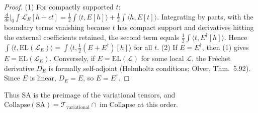 \documentclass{article}
\theoremstyle{remark}
\newcommand{\Coll}{\mathrm{Collapse}}
\begin{document}
\begin{proof}
(1) For compactly supported $t$: $\frac{d}{d\epsilon}\big|_0\int\mathcal L_E[h+\epsilon t]=\tfrac12\int\langle t,E[h]\rangle+\tfrac12\int\langle h,E[t]\rangle$.
Integrating by parts, with the boundary terms vanishing because $t$ has compact support and derivatives hitting the external coefficients retained, the second term equals $\tfrac12\int\langle t,E^\dagger[h]\rangle$.
Hence $\int\langle t,\mathrm{EL}(\mathcal L_E)\rangle=\int\langle t,\tfrac12(E+E^\dagger)[h]\rangle$ for all $t$.
(2) If $E=E^\dagger$, then (1) gives $E=\mathrm{EL}(\mathcal L_E)$.
Conversely, if $E=\mathrm{EL}(\mathcal L)$ for some local $\mathcal L$, the Fr\'echet derivative $D_E$ is formally self-adjoint (Helmholtz conditions; Olver, Thm.~5.92).
Since $E$ is linear, $D_E=E$, so $E=E^\dagger$.
\end{proof}

Thus $\mathrm{SA}$ is the preimage of the variational tensors, and $\Coll(\mathrm{SA})=\mathcal T_{\mathrm{variational}}\cap\operatorname{im}\Coll$ at this order.
\end{document}
